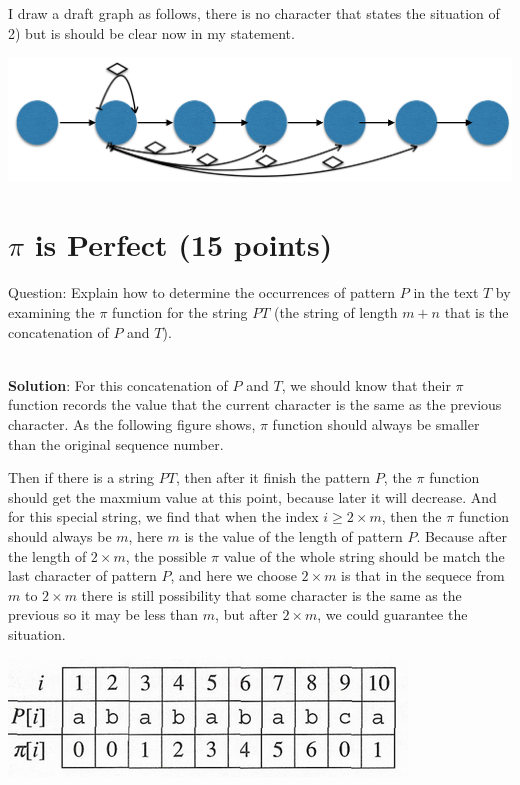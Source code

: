 \documentclass{article}
\begin{document}
I draw a draft graph as follows, there is no character that states the situation of 2) but is should be clear now in my statement.

\begin{center}
\includegraphics[scale=0.3]{hw7_3.png}
\end{center}


\section{$\pi$ is Perfect (15 points)}
Question: Explain how to determine the occurrences of pattern $P$ in the text $T$ by examining the $\pi$ function for the string $PT$ (the string of length $m+n$ that is the concatenation of $P$ and $T$).

~\\
\textbf{Solution}:\newline
\indent For this concatenation of $P$ and $T$, we should know that their $\pi$ function records the value that the current character is the same as the previous character. As the following figure shows, $\pi$ function should always be smaller than the original sequence number.

Then if there is a string $PT$, then after it finish the pattern $P$, the $\pi$ function should get the maxmium value at this point, because later it will decrease. And for this special string, we find that when the index $i \geq {2 \times m}$, then the $\pi$ function should always be $m$, here $m$ is the value of the length of pattern $P$. Because after the length of $2 \times m$, the possible $\pi$ value of the whole string should be match the last character of pattern $P$, and here we choose $2 \times m$ is that in the sequece from $m$ to $2 \times m$ there is still possibility that some character is the same as the previous so it may be less than $m$, but after $2  \times m$, we could guarantee the situation.


\begin{center}
\includegraphics[scale=0.3]{hw7_5.png}
\end{center}
\end{document}

